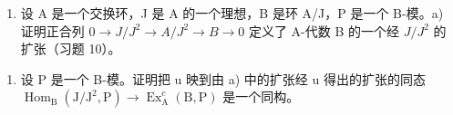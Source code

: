 \begin{enumerate}
\def\labelenumi{\arabic{enumi})}
\setcounter{enumi}{11}
\tightlist
\item
  设 A 是一个交换环，J 是 A 的一个理想，B 是环 A/J，P 是一个 B-模。a) 证明正合列 \(0 \rightarrow J/J^{2} \rightarrow A/J^{2} \rightarrow B \rightarrow 0\) 定义了 A-代数 B 的一个经 \(J/J^{2}\) 的扩张（习题 10）。
\end{enumerate}

\begin{enumerate}
\def\labelenumi{\alph{enumi})}
\setcounter{enumi}{1}
\tightlist
\item
  设 P 是一个 B-模。证明把 u 映到由 a) 中的扩张经 u 得出的扩张的同态 \(\operatorname{Hom}_{\mathrm{B}}(\mathrm{J}/\mathrm{J}^{2},\mathrm{P}) \to \operatorname{Ex}_{\mathrm{A}}^{c}(\mathrm{B},\mathrm{P})\) 是一个同构。
\end{enumerate}

